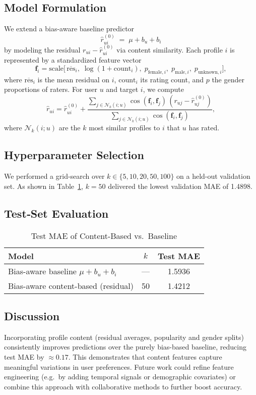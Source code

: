 \subsection*{Model Formulation}
We extend a bias-aware baseline predictor 
\[
  \hat r_{ui}^{(0)} \;=\; \mu + b_u + b_i
\]
by modeling the residual \(r_{ui} - \hat r_{ui}^{(0)}\) via content similarity.  Each profile \(i\) is represented by a standardized feature vector 
\[
  \mathbf{f}_i = \mathrm{scale}\bigl[\,
    \overline{\mathrm{res}}_i,\;
    \log(1 + \mathrm{count}_i),\;
    p_{\mathrm{female},i},\;
    p_{\mathrm{male},i},\;
    p_{\mathrm{unknown},i}
  \bigr],
\]
where \(\overline{\mathrm{res}}_i\) is the mean residual on \(i\), \(\mathrm{count}_i\) its rating count, and \(p\) the gender proportions of raters.  For user \(u\) and target \(i\), we compute
\[
  \hat r_{ui}
  = \hat r_{ui}^{(0)}
  + \frac{\sum_{j\in\mathcal N_k(i;u)} 
               \cos(\mathbf f_i,\mathbf f_j)\,(r_{uj} - \hat r_{uj}^{(0)})}
         {\sum_{j\in\mathcal N_k(i;u)} \cos(\mathbf f_i,\mathbf f_j)},
\]
where \(\mathcal N_k(i;u)\) are the \(k\) most similar profiles to \(i\) that \(u\) has rated.

\subsection*{Hyperparameter Selection}
We performed a grid-search over \(k\in\{5,10,20,50,100\}\) on a held-out validation set.  As shown in Table~\ref{tab:cbf}, \(k=50\) delivered the lowest validation MAE of 1.4898.

\subsection*{Test‐Set Evaluation}
\begin{table}[H]
  \centering
  \caption{Test MAE of Content-Based vs.\ Baseline}
  \label{tab:cbf}
  \begin{tabular}{@{}lcc@{}}
    \toprule
    Model                            & \(k\) & Test MAE \\ 
    \midrule
    Bias-aware baseline \(\mu+b_u+b_i\)     & —     & 1.5936   \\
    Bias-aware content-based (residual)     & 50    & 1.4212   \\
    \bottomrule
  \end{tabular}
\end{table}

\subsection*{Discussion}
Incorporating profile content (residual averages, popularity and gender splits) consistently improves predictions over the purely bias-based baseline, reducing test MAE by \(\approx\!0.17\).  This demonstrates that content features capture meaningful variations in user preferences.  Future work could refine feature engineering (e.g.\ by adding temporal signals or demographic covariates) or combine this approach with collaborative methods to further boost accuracy.